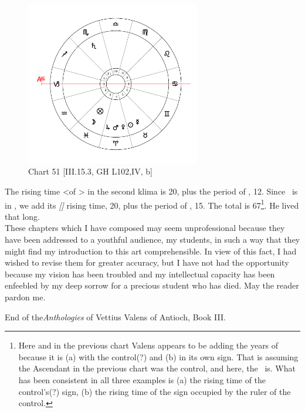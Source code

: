 \clearpage
\begin{figure}
\centering
\vspace{-28pt}
\includegraphics[width=0.68\textwidth]{charts/3_15_3}
\caption{Chart 51 [III.15.3, GH L102,IV, b]}
\label{fig:chart51}
\end{figure} 

The rising time <of \Pisces> in the second klima is 20, plus the period of \Jupiter, 12. Since \Jupiter\, is in \Aries, we add its \textsl{[\Aries]} rising time, 20, plus the period of \Mars, 15. The total is 67\footnote{Here and in the previous chart Valens appears to be adding the years of \Mars\, because it is (a) with the control(?) and (b) in its own sign. That is assuming the Ascendant in the previous chart was the control, and here, the \Moon\, is. What has been consistent in all three examples is (a) the rising time of the control's(?) sign, (b) the rising time of the sign occupied by the ruler of the control.}. He lived that long. \\
\newline
\newline
These chapters which I have composed may seem unprofessional because they have been addressed to a youthful audience, my students, in such a way that they might find my introduction to this art comprehensible. In view of this fact, I had wished to revise them for greater accuracy, but I have not had the opportunity because my vision has been troubled and my intellectual capacity has been enfeebled by my deep sorrow for a precious student who has died. May the reader pardon me.

End of the\textit{Anthologies} of Vettius Valens of Antioch, Book III.

\newpage